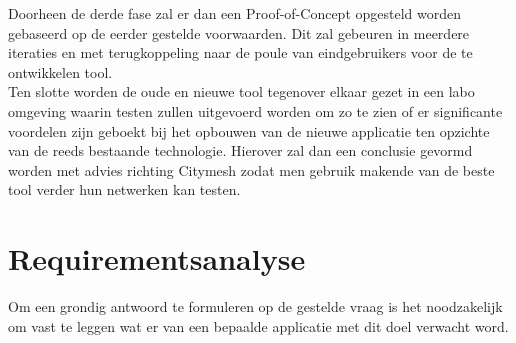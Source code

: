 Doorheen de derde fase zal er dan een Proof-of-Concept opgesteld worden gebaseerd op de eerder gestelde voorwaarden. Dit zal gebeuren in meerdere iteraties en met terugkoppeling naar de poule van eindgebruikers voor de te ontwikkelen tool. \\

Ten slotte worden de oude en nieuwe tool tegenover elkaar gezet in een labo omgeving waarin testen zullen uitgevoerd worden om zo te zien of er significante voordelen zijn geboekt bij het opbouwen van de nieuwe applicatie ten opzichte van de reeds bestaande technologie. Hierover zal dan een conclusie gevormd worden met advies richting Citymesh zodat men gebruik makende van de beste tool verder hun netwerken kan testen.

\section{Requirementsanalyse}

Om een grondig antwoord te formuleren op de gestelde vraag is het noodzakelijk om vast te leggen wat er van een bepaalde applicatie met dit doel verwacht word.

